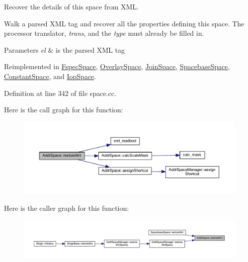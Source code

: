 Recover the details of this space from X\+ML. 

Walk a parsed X\+ML tag and recover all the properties defining this space. The processor translator, {\itshape trans}, and the {\itshape type} must already be filled in. 
\begin{DoxyParams}{Parameters}
{\em el} & is the parsed X\+ML tag \\
\hline
\end{DoxyParams}


Reimplemented in \mbox{\hyperlink{class_fspec_space_ad0061e3e6e13bdd7349f643e44d8947d}{Fspec\+Space}}, \mbox{\hyperlink{class_overlay_space_ac954d7e1ddb57d0f811b4200bd0deee2}{Overlay\+Space}}, \mbox{\hyperlink{class_join_space_a55fb2e082c5547f3b4ff4022de86c895}{Join\+Space}}, \mbox{\hyperlink{class_spacebase_space_adb45445a3286d78920f1c96074dd6229}{Spacebase\+Space}}, \mbox{\hyperlink{class_constant_space_ae29b82af12a38637ded7c4b1c57d7367}{Constant\+Space}}, and \mbox{\hyperlink{class_iop_space_a7c530a1e977334d59d2ebbc33147bcd9}{Iop\+Space}}.



Definition at line 342 of file space.\+cc.

Here is the call graph for this function\+:
\nopagebreak
\begin{figure}[H]
\begin{center}
\leavevmode
\includegraphics[width=350pt]{class_addr_space_aa2fe50d288eef7ea713cce99774c4eca_cgraph}
\end{center}
\end{figure}
Here is the caller graph for this function\+:
\nopagebreak
\begin{figure}[H]
\begin{center}
\leavevmode
\includegraphics[width=350pt]{class_addr_space_aa2fe50d288eef7ea713cce99774c4eca_icgraph}
\end{center}
\end{figure}
\mbox{\label{class_addr_space_aa20e53222697512db0a64db75179ead2}} 
